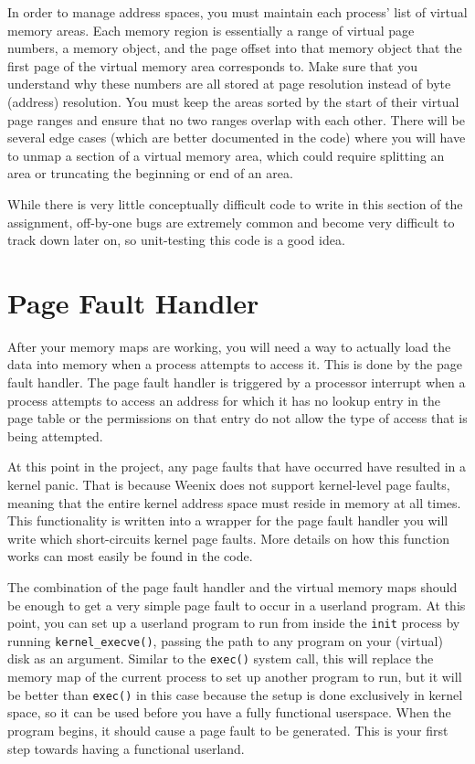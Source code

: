 In order to manage address spaces, you must maintain each process' list of virtual memory areas. Each memory region is essentially a range of virtual page numbers, a memory object, and the page offset into that memory object that the first page of the virtual memory area corresponds to. Make sure that you understand why these numbers are all stored at page resolution instead of byte (address) resolution. You must keep the areas sorted by the start of their virtual page ranges and ensure that no two ranges overlap with each other. There will be several edge cases (which are better documented in the code) where you will have to unmap a section of a virtual memory area, which could require splitting an area or truncating the beginning or end of an area.

While there is very little conceptually difficult code to write in this section of the assignment, off-by-one bugs are extremely common and become very difficult to track down later on, so unit-testing this code is a good idea.

\section{Page Fault Handler}

After your memory maps are working, you will need a way to actually load the data into memory when a process attempts to access it. This is done by the page fault handler. The page fault handler is triggered by a processor interrupt when a process attempts to access an address for which it has no lookup entry in the page table or the permissions on that entry do not allow the type of access that is being attempted.

At this point in the project, any page faults that have occurred have resulted in a kernel panic. That is because Weenix does not support kernel-level page faults, meaning that the entire kernel address space must reside in memory at all times. This functionality is written into a wrapper for the page fault handler you will write which short-circuits kernel page faults. More details on how this function works can most easily be found in the code.

The combination of the page fault handler and the virtual memory maps should be enough to get a very simple page fault to occur in a userland program. At this point, you can set up a userland program to run from inside the \texttt{init} process by running \texttt{kernel\_execve()}, passing the path to any program on your (virtual) disk as an argument. Similar to the \texttt{exec()} system call, this will replace the memory map of the current process to set up another program to run, but it will be better than \texttt{exec()} in this case because the setup is done exclusively in kernel space, so it can be used before you have a fully functional userspace. When the program begins, it should cause a page fault to be generated. This is your first step towards having a functional userland.

